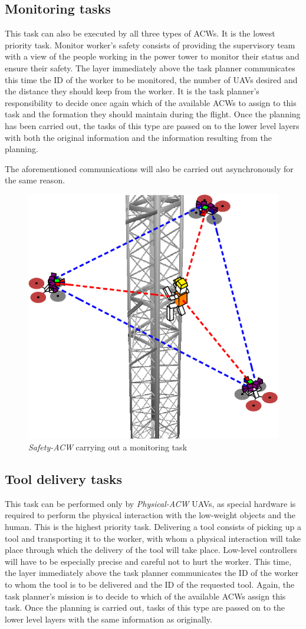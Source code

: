 \subsection{Monitoring tasks}
\label{subsec:MonitoringTasks}
This task can also be executed by all three types of \glspl{ACW}. It is the lowest priority task. Monitor worker's safety consists of providing the supervisory team with a view of the people working in the power tower to monitor their status and ensure their safety. The layer immediately above the task planner communicates this time the \gls{ID} of the worker to be monitored, the number of \glspl{UAV} desired and the distance they should keep from the worker. It is the task planner's responsibility to decide once again which of the available \glspl{ACW} to assign to this task and the formation they should maintain during the flight. Once the planning has been carried out, the tasks of this type are passed on to the lower level layers with both the original information and the information resulting from the planning.

The aforementioned communications will also be carried out asynchronously for the same reason. 

\begin{figure}[htbp]
    \centering
    \includegraphics[width=0.5\linewidth]
    {ProblemFormulation/figures/monitor_task.pdf}
    \caption{\textit{Safety-ACW} carrying out a monitoring task}
    \label{fig:monitor_task}
\end{figure}

\subsection{Tool delivery tasks}
\label{subsec:ToolDeliveryTasks}
This task can be performed only by \textit{Physical-ACW} \glspl{UAV}, as special hardware is required to perform the physical interaction with the low-weight objects and the human. This is the highest priority task. Delivering a tool consists of picking up a tool and transporting it to the worker, with whom a physical interaction will take place through which the delivery of the tool will take place. Low-level controllers will have to be especially precise and careful not to hurt the worker. This time, the layer immediately above the task planner communicates the \gls{ID} of the worker to whom the tool is to be delivered and the \gls{ID} of the requested tool. Again, the task planner's mission is to decide to which of the available \glspl{ACW} assign this task. Once the planning is carried out, tasks of this type are passed on to the lower level layers with the same information as originally.

